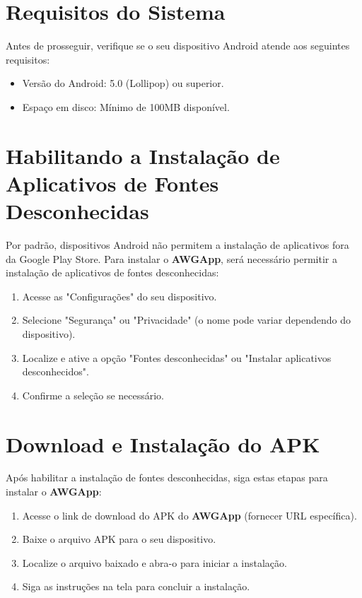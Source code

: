 \documentclass[12pt,a4paper]{book}
\newcommand{\nomesoftware}{AWGApp}
\begin{document}
\section{Requisitos do Sistema}

Antes de prosseguir, verifique se o seu dispositivo Android atende aos seguintes requisitos:

\begin{itemize}
    \item Versão do Android: 5.0 (Lollipop) ou superior.
    \item Espaço em disco: Mínimo de 100MB disponível.
\end{itemize}

\section{Habilitando a Instalação de Aplicativos de Fontes Desconhecidas}

Por padrão, dispositivos Android não permitem a instalação de aplicativos fora da Google Play Store. Para instalar o \textbf{\nomesoftware{}}, será necessário permitir a instalação de aplicativos de fontes desconhecidas:

\begin{enumerate}
    \item Acesse as "Configurações" do seu dispositivo.
    \item Selecione "Segurança" ou "Privacidade" (o nome pode variar dependendo do dispositivo).
    \item Localize e ative a opção "Fontes desconhecidas" ou "Instalar aplicativos desconhecidos".
    \item Confirme a seleção se necessário.
\end{enumerate}

\section{Download e Instalação do APK}

Após habilitar a instalação de fontes desconhecidas, siga estas etapas para instalar o \textbf{\nomesoftware{}}:

\begin{enumerate}
    \item Acesse o link de download do APK do \textbf{\nomesoftware{}} (fornecer URL específica).
    \item Baixe o arquivo APK para o seu dispositivo.
    \item Localize o arquivo baixado e abra-o para iniciar a instalação.
    \item Siga as instruções na tela para concluir a instalação.
\end{enumerate}
\end{document}
